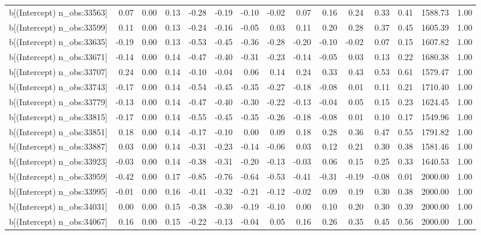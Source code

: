 \begin{table}[ht]
\begin{tabular}{rrrrrrrrrrrrrrr}
  b[(Intercept) n\_obs:33563] & 0.07 & 0.00 & 0.13 & -0.28 & -0.19 & -0.10 & -0.02 & 0.07 & 0.16 & 0.24 & 0.33 & 0.41 & 1588.73 & 1.00 \\ 
  b[(Intercept) n\_obs:33599] & 0.11 & 0.00 & 0.13 & -0.24 & -0.16 & -0.05 & 0.03 & 0.11 & 0.20 & 0.28 & 0.37 & 0.45 & 1605.39 & 1.00 \\ 
  b[(Intercept) n\_obs:33635] & -0.19 & 0.00 & 0.13 & -0.53 & -0.45 & -0.36 & -0.28 & -0.20 & -0.10 & -0.02 & 0.07 & 0.15 & 1607.82 & 1.00 \\ 
  b[(Intercept) n\_obs:33671] & -0.14 & 0.00 & 0.14 & -0.47 & -0.40 & -0.31 & -0.23 & -0.14 & -0.05 & 0.03 & 0.13 & 0.22 & 1680.38 & 1.00 \\ 
  b[(Intercept) n\_obs:33707] & 0.24 & 0.00 & 0.14 & -0.10 & -0.04 & 0.06 & 0.14 & 0.24 & 0.33 & 0.43 & 0.53 & 0.61 & 1579.47 & 1.00 \\ 
  b[(Intercept) n\_obs:33743] & -0.17 & 0.00 & 0.14 & -0.54 & -0.45 & -0.35 & -0.27 & -0.18 & -0.08 & 0.01 & 0.11 & 0.21 & 1710.40 & 1.00 \\ 
  b[(Intercept) n\_obs:33779] & -0.13 & 0.00 & 0.14 & -0.47 & -0.40 & -0.30 & -0.22 & -0.13 & -0.04 & 0.05 & 0.15 & 0.23 & 1624.45 & 1.00 \\ 
  b[(Intercept) n\_obs:33815] & -0.17 & 0.00 & 0.14 & -0.55 & -0.45 & -0.35 & -0.26 & -0.18 & -0.08 & 0.01 & 0.10 & 0.17 & 1549.96 & 1.00 \\ 
  b[(Intercept) n\_obs:33851] & 0.18 & 0.00 & 0.14 & -0.17 & -0.10 & 0.00 & 0.09 & 0.18 & 0.28 & 0.36 & 0.47 & 0.55 & 1791.82 & 1.00 \\ 
  b[(Intercept) n\_obs:33887] & 0.03 & 0.00 & 0.14 & -0.31 & -0.23 & -0.14 & -0.06 & 0.03 & 0.12 & 0.21 & 0.30 & 0.38 & 1581.46 & 1.00 \\ 
  b[(Intercept) n\_obs:33923] & -0.03 & 0.00 & 0.14 & -0.38 & -0.31 & -0.20 & -0.13 & -0.03 & 0.06 & 0.15 & 0.25 & 0.33 & 1640.53 & 1.00 \\ 
  b[(Intercept) n\_obs:33959] & -0.42 & 0.00 & 0.17 & -0.85 & -0.76 & -0.64 & -0.53 & -0.41 & -0.31 & -0.19 & -0.08 & 0.01 & 2000.00 & 1.00 \\ 
  b[(Intercept) n\_obs:33995] & -0.01 & 0.00 & 0.16 & -0.41 & -0.32 & -0.21 & -0.12 & -0.02 & 0.09 & 0.19 & 0.30 & 0.38 & 2000.00 & 1.00 \\ 
  b[(Intercept) n\_obs:34031] & 0.00 & 0.00 & 0.15 & -0.38 & -0.30 & -0.19 & -0.10 & 0.00 & 0.10 & 0.20 & 0.30 & 0.39 & 2000.00 & 1.00 \\ 
  b[(Intercept) n\_obs:34067] & 0.16 & 0.00 & 0.15 & -0.22 & -0.13 & -0.04 & 0.05 & 0.16 & 0.26 & 0.35 & 0.45 & 0.56 & 2000.00 & 1.00 \\ 

\end{tabular}
\end{table}
